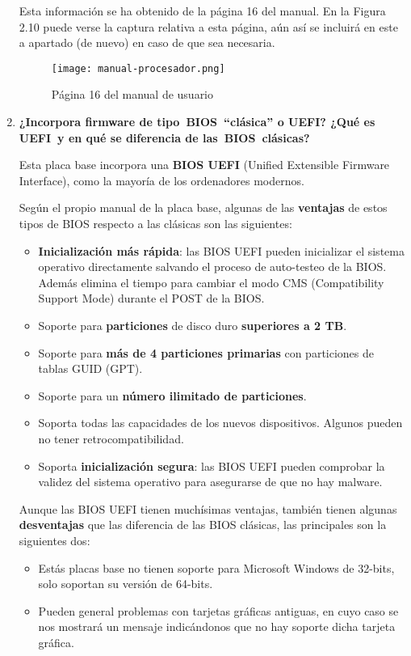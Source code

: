 \begin{enumerate}
    Esta información se ha obtenido de la página 16 del manual. En la Figura 2.10 puede verse la captura relativa a esta página, aún así se incluirá en este a apartado (de nuevo) en caso de que sea necesaria.

    \begin{figure}[ht]
        \centering
        \texttt{[image: manual-procesador.png]}
        \caption{Página 16 del manual de usuario}
    \end{figure}

    \item \textbf{¿Incorpora firmware de tipo BIOS ``clásica'' o UEFI? ¿Qué es UEFI y en qué se diferencia de las BIOS clásicas?}

    Esta placa base incorpora una \textbf{BIOS UEFI} (Unified Extensible Firmware Interface), como la mayoría de los ordenadores modernos.

     Según el propio manual de la placa base, algunas de las \textbf{ventajas} de estos tipos de BIOS respecto a las clásicas son las siguientes:
    \begin{itemize}
        \item \textbf{Inicialización más rápida}: las BIOS UEFI pueden inicializar el sistema operativo directamente salvando el proceso de auto-testeo de la BIOS. Además elimina el tiempo para cambiar el modo CMS (Compatibility Support Mode) durante el POST de la BIOS.

        \item Soporte para \textbf{particiones} de disco duro \textbf{superiores a 2 TB}.
        \item Soporte para \textbf{más de 4 particiones primarias} con particiones de tablas GUID (GPT).
        \item Soporte para un \textbf{número ilimitado de particiones}.
        \item Soporta todas las capacidades de los nuevos dispositivos. Algunos pueden no tener retrocompatibilidad.
        \item Soporta \textbf{inicialización segura}: las BIOS UEFI pueden comprobar la validez del sistema operativo para asegurarse de que no hay malware.
    \end{itemize}

    Aunque las BIOS UEFI tienen muchísimas ventajas, también tienen algunas \textbf{desventajas} que las diferencia de las BIOS clásicas, las principales son la siguientes dos:

    \begin{itemize}
        \item Estás placas base no tienen soporte para Microsoft Windows de 32-bits, solo soportan su versión de 64-bits.
        \item Pueden general problemas con tarjetas gráficas antiguas, en cuyo caso se nos mostrará un mensaje indicándonos que no hay soporte dicha tarjeta gráfica.


\end{itemize}
\end{enumerate}
